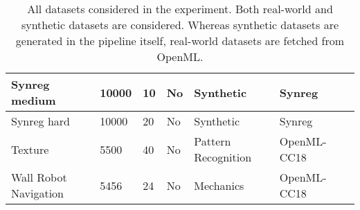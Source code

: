\documentclass[../main.tex]{subfiles}
\begin{document}
\begin{table}[ht]
\begin{tabular}{| l | l | l | l | l | l | l |}
    \hline
    Synreg medium & 10000 & 10 & No & Synthetic & Synreg \\ 
    \hline
    Synreg hard & 10000 & 20 & No & Synthetic & Synreg \\ 
    \hline
    Texture & 5500 & 40 & No & Pattern Recognition & OpenML-CC18 \citep{bischl_openml_2019} \\ 
    \hline
    Wall Robot Navigation & 5456 & 24 & No & Mechanics & OpenML-CC18 \citep{bischl_openml_2019} \\ 
    \hline
    \end{tabular}
    \caption{All datasets considered in the experiment. Both real-world and synthetic datasets are considered. Whereas synthetic datasets are generated in the pipeline itself, real-world datasets are fetched from OpenML.}
    \label{table:experiments-dataset-specification}
\end{table}



\biblio
\end{document}
